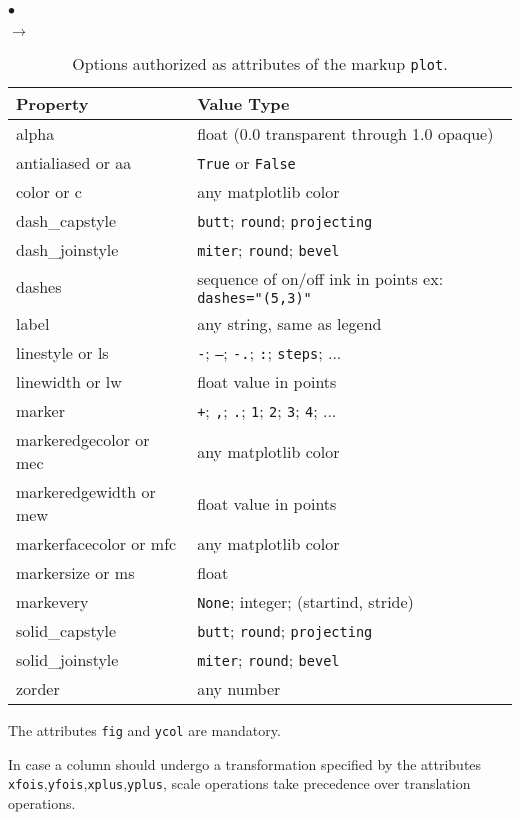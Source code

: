 \documentclass[a4paper,10pt,twoside]{csshortdoc}
\begin{document}
\begin{list}{$\bullet$}{}
\begin{list}{$\rightarrow$}{}
\begin{table}[htbp]
\begin{center}
\begin{tabular}{|l|l|}
\hline
\textbf{Property} & \textbf{Value Type} \\
\hline
alpha & float (0.0 transparent through 1.0 opaque) \\
antialiased or aa & \texttt{True} or \texttt{False} \\
color or c & any matplotlib color \\
dash\_capstyle & \texttt{butt}; \texttt{round}; \texttt{projecting} \\
dash\_joinstyle & \texttt{miter}; \texttt{round}; \texttt{bevel} \\
dashes & sequence of on/off ink in points ex: \texttt{dashes="(5,3)"} \\
label & any string, same as legend\\
linestyle or ls &  \texttt{-}; \texttt{--}; \texttt{-.}; \texttt{:}; \texttt{steps}; ... \\
linewidth or lw & float value in points \\
marker &  \texttt{+}; \texttt{,}; \texttt{.}; \texttt{1}; \texttt{2}; \texttt{3}; \texttt{4}; ... \\
markeredgecolor or mec & any matplotlib color \\
markeredgewidth or mew & float value in points \\
markerfacecolor or mfc & any matplotlib color \\
markersize or ms & float \\
markevery & \texttt{None}; integer; (startind, stride) \\
solid\_capstyle & \texttt{butt}; \texttt{round}; \texttt{projecting} \\
solid\_joinstyle & \texttt{miter}; \texttt{round}; \texttt{bevel} \\
zorder & any number \\
\hline
\end{tabular}
\end{center}
\caption{Options authorized as attributes of the markup \texttt{plot}.}
\label{table:curves}
\end{table}

\end{list}
\end{list}

The attributes \texttt{fig} and \texttt{ycol} are mandatory.

In case a column should undergo a transformation specified by the attributes
\texttt{xfois},\texttt{yfois},\texttt{xplus},\texttt{yplus}, scale operations
take precedence over translation operations.
\end{document}
